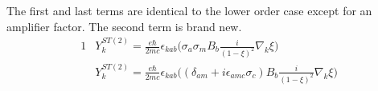 \documentclass[]{article}
\numberwithin{equation}{subsection}
\begin{document}
The first and last terms are identical to the lower order case except for an amplifier factor. The second term is brand new.
\begin{alignat}{1}
  \label{m81}  &Y_{k}^{ST(2)}=\frac{e\hbar}{2mc}\epsilon_{kab}\Big(\sigma_{a}\sigma_{m}B_{b}\frac{i}{(1-\xi)^{2}}\nabla_{k}\xi\Big)\\
  \label{m82}  &Y_{k}^{ST(2)}=\frac{e\hbar}{2mc}\epsilon_{kab}\Big((\delta_{am}+i\epsilon_{amc}\sigma_{c})B_{b}\frac{i}{(1-\xi)^{2}}\nabla_{k}\xi\Big)
\end{alignat}
\end{document}
